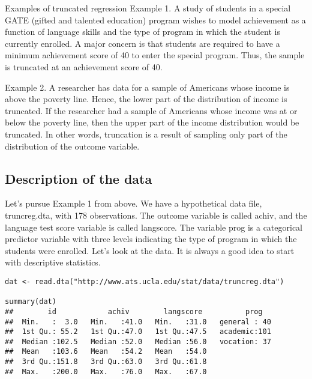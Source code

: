 Examples of truncated regression
Example 1. A study of students in a special GATE (gifted and talented education) program wishes to model achievement as a function of language skills and the type of program in which the student is currently enrolled. A major concern is that students are required to have a minimum achievement score of 40 to enter the special program. Thus, the sample is truncated at an achievement score of 40.

Example 2. A researcher has data for a sample of Americans whose income is above the poverty line. Hence, the lower part of the distribution of income is truncated. If the researcher had a sample of Americans whose income was at or below the poverty line, then the upper part of the income distribution would be truncated. In other words, truncation is a result of sampling only part of the distribution of the outcome variable.

\subsection{Description of the data}
Let's pursue Example 1 from above. We have a hypothetical data file, truncreg.dta, with 178 observations. The outcome variable is called achiv, and the language test score variable is called langscore. The variable prog is a categorical predictor variable with three levels indicating the type of program in which the students were enrolled. Let's look at the data. It is always a good idea to start with descriptive statistics.

\begin{framed}
\begin{verbatim}
dat <- read.dta("http://www.ats.ucla.edu/stat/data/truncreg.dta")

summary(dat)
##        id            achiv        langscore          prog    
##  Min.   :  3.0   Min.   :41.0   Min.   :31.0   general : 40  
##  1st Qu.: 55.2   1st Qu.:47.0   1st Qu.:47.5   academic:101  
##  Median :102.5   Median :52.0   Median :56.0   vocation: 37  
##  Mean   :103.6   Mean   :54.2   Mean   :54.0                 
##  3rd Qu.:151.8   3rd Qu.:63.0   3rd Qu.:61.8                 
##  Max.   :200.0   Max.   :76.0   Max.   :67.0
\end{verbatim}
\end{framed}
